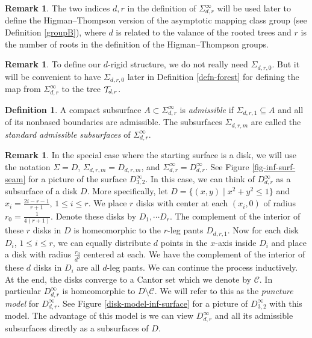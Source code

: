 \documentclass[11pt, a4paper]{amsart}
\theoremstyle{definition}
\newtheorem{rem}[thm]{Remark}
\newtheorem{defn}[thm]{Definition} %
\newcommand{\CC}{{\mathcal {C}}}
\begin{document}
\begin{rem}
The two indices $d,r$ in the definition of $\Sigma^{\infty}_{d,r}$ will be used later to define the Higman--Thompson version of the asymptotic mapping class group (see Definition \ref{groupB}), where $d$ is related to the valance of the rooted trees and $r$ is the number of roots in the definition of the Higman--Thompson groups.  
\end{rem}

\begin{rem}
 To define our $d$-rigid structure, we do not really need $\Sigma_{d,r,0}$. But it will be  convenient  to have $\Sigma_{d,r,0}$   later  in Definition \ref{defn-forest} for defining the map from  $\Sigma^{\infty}_{d,r}$ to the tree ${\mathcal {T}}_{d,r}$.
\end{rem}

\begin{defn}\label{defn-add-subsur}
 A compact subsurface $A \subset \Sigma^{\infty}_{d,r}$ is {\em admissible} if $\Sigma_{d,r,1} \subseteq A$ and all of its nonbased boundaries are admissible. The subsurfaces $\Sigma_{d,r,m}$ are called the \emph{standard admissible subsurfaces} of $\Sigma^{\infty}_{d,r}$. 
\end{defn}

\begin{rem}\label{rem-emb-model-disk}
In the special case where the starting surface is a disk, we will use the notation $\Sigma=D$, $\Sigma_{d,r,m}=D_{d,r,m}$, and $\Sigma^{\infty}_{d,r}=D^{\infty}_{d,r}$. See Figure \ref{fig-inf-surf-seam} for a picture of the surface $D^{\infty}_{3,2}$. 
In this case, we can think of $D^{\infty}_{d,r}$ as a subsurface of a disk $D$. More specifically, let $D= \{(x,y)\mid x^2 + y^2 \leq 1\}$ and $x_i= \frac{2i-r-1}{r+1}$, $1\leq i\leq r$. We place $r$ disks with center at each $(x_i,0)$ of radius $r_0=\frac{1}{4(r+1)}$. Denote these disks by $D_1,\cdots D_r$. The complement of the interior of these $r$ disks in $D$ is homeomorphic to the $r$-leg pants $D_{d,r,1}$. Now for each disk  $D_i$, $1\leq i \leq r$, we can equally distribute $d$ points in the $x$-axis inside $D_i$ and place a disk with radius $\frac{r_0}{d^2}$ centered at each. We have the complement of the interior of these $d$ disks in $D_i$ are all  $d$-leg pants. We can continue the process inductively. At the end, the disks converge to a Cantor set which we denote by $\CC$. In particular $D^{\infty}_{d,r}$ is homeomorphic to $D \setminus \CC$.  We will refer to this as the {\em puncture model} for $D^{\infty}_{d,r}$. See Figure \ref{disk-model-inf-surface} for a picture of $D_{3,2}^\infty$ with this model.  The advantage of this model is we can view $D^{\infty}_{d,r}$ and all its admissible subsurfaces directly as a subsurfaces of $D$. 
\end{rem}
\end{document}
